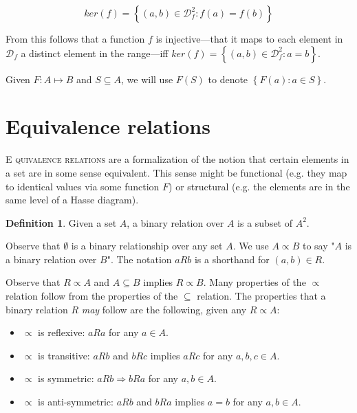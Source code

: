 \documentclass[a4paper, 12pt]{article}
\theoremstyle{definition}
\theoremstyle{definition}
\theoremstyle{definition}
\newtheorem{definition}{Definition}
\begin{document}
\begin{equation*}
    ker(f) = \left\{ (a, b) \in \mathcal{D}_f^2 : f(a) = f(b) \right\} 
\end{equation*}

From this follows that a function $f$ is injective---that it maps to each element
in $\mathcal{D}_f$ a distinct element in the range---iff $ker(f) =
\left\{ (a, b) \in \mathcal{D}_f^2 : a = b \right\} $.

Given $F : A \mapsto B$ and $S \subseteq A$, we will use $F(S)$ to denote
$\left\{ F(a) : a \in S \right\} $.



\pagebreak
{}
\section{Equivalence relations}

\lettrine{E}{ quivalence relations} are a formalization of the notion 
that certain elements in a set are in some sense equivalent. This 
sense might be functional (e.g. they map to identical values via some 
function $F$) or structural (e.g. the elements are in the same level of 
a Hasse diagram).

\begin{definition}
    Given a set $A$, a binary relation over $A$ is a subset of $A^2$.
\end{definition}

Observe that $\emptyset$ is a binary relationship over any set $A$. We use $A
\propto B$ to say "$A$ is a binary relation over $B$". The notation $aRb$ is a
shorthand for $(a, b) \in R$.

Observe that $R \propto A$ and $A \subseteq B$ implies $R \propto B$. Many
properties of the $\propto $ relation follow from the properties of the $\subseteq $
relation. The properties that a binary relation $R$ \textit{may} follow are the
following, given any $R \propto A$:

\begin{itemize}
    \item $\propto $ is reflexive: $aRa$ for any $a \in A$.
    \item $\propto $ is transitive: $aRb$ and $bRc$ implies $aRc$ for any $a, b,
        c \in A$.
    \item $\propto $ is symmetric: $aRb \Rightarrow bRa$ for any $a, b \in A$.
    \item $\propto $ is anti-symmetric: $aRb$ and $bRa$ implies $a = b$ for any
        $a, b \in A$.
\end{itemize}
\end{document}

